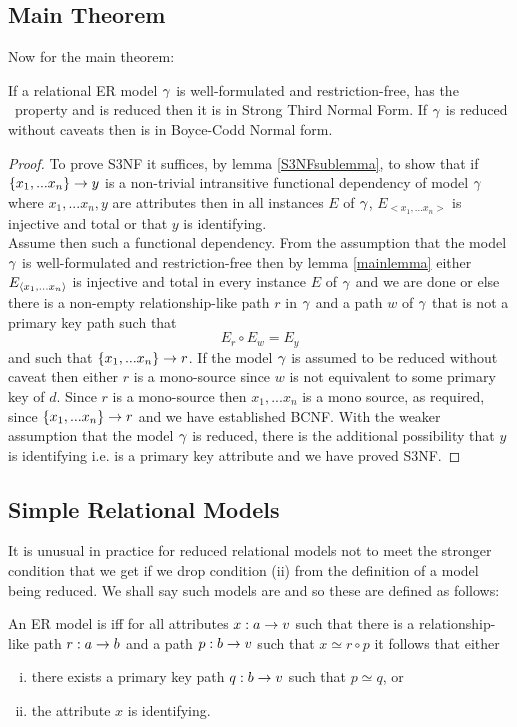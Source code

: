 \subsection{Main Theorem}
\noindent Now for the main theorem:
\begin{theorem}
\label{maintheorem}
\noindent If a relational ER model $\gamma$ is well-formulated and restriction-free, has the \fdfactoring\ property and is reduced then it is in Strong Third Normal Form. 
If  $\gamma$ is reduced without caveats then is in Boyce-Codd Normal form.
\end{theorem}
\begin{proof}
To prove S3NF it suffices, by lemma \ref{S3NFsublemma},  to show that if 
$\left\{x_1,...x_n\right\} \rightarrow y$ is a non-trivial intransitive functional dependency of model $\gamma$
where $x_1,...x_n,y$ are attributes 
then  in all instances
$E$ of $\gamma$, $E_{<x_1,...x_n>}$ is injective and total or that $y$
is identifying. \\
Assume then such a functional dependency.
From the assumption that the model $\gamma$ is well-formulated and restriction-free
then by lemma \ref{mainlemma} 
either $E_{\langle x_1,...x_n \rangle}$ is
injective and total in every instance $E$ of $\gamma$ and we are done
or else there is a non-empty relationship-like path $r$ in $\gamma$
and a path $w$ of $\gamma$ that is not a primary key path such that
\begin{equation}
\label{simpleRepresentation}
 E_r \circ E_w = E_y
\end{equation}
and such that $\left\{x_1,...x_n\right\} \rightarrow r$.
If the model $\gamma$ is assumed to be reduced without caveat then either $r$ is a mono-source since $w$ is not equivalent to some primary key of $d$.
Since $r$ is a mono-source then $x_1,...x_n$ is a mono source, as required, since $\left\{x_1,...x_n\right\} \rightarrow r$ and we have established BCNF.
With the weaker assumption that the model $\gamma$ is reduced, there is the additional possibility that $y$ is identifying i.e. is a primary key attribute and we have proved S3NF.
\end{proof}
\subsection{Simple Relational Models}
It is unusual in practice for reduced relational models not to meet the stronger condition that we get if we drop condition (ii) from the definition of a model being reduced. We shall say such models are  and so these are defined as follows:
\begin{definition} 
An  ER model is  iff for all attributes $x:a \rightarrow v$
such that there is a relationship-like path $r:a \rightarrow b$ and a path $p:b \rightarrow v$ such that
$x \simeq r \circ p$ it follows that 
either 
\begin{enumerate} [(i)]
\item there exists a primary key path  $q:b \rightarrow v$ such that $p \simeq q$, or
\item the attribute $x$ is identifying.
\end{enumerate}
\end{definition}

